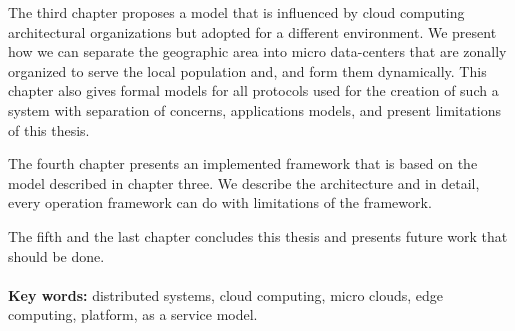 The third chapter proposes a model that is influenced by cloud computing architectural organizations but adopted for a different environment. We present how we can separate the geographic area into micro data-centers that are zonally organized to serve the local population and, and form them dynamically. This chapter also gives formal models for all protocols used for the creation of such a system with separation of concerns, applications models, and present limitations of this thesis.

The fourth chapter presents an implemented framework that is based on the model described in chapter three. We describe the architecture and in detail, every operation framework can do with limitations of the framework.

The fifth and the last chapter concludes this thesis and presents future work that should be done.\\\\ 

\noindent
\textbf{Key words:} distributed systems, cloud computing, micro clouds, edge computing, platform, as a service model.